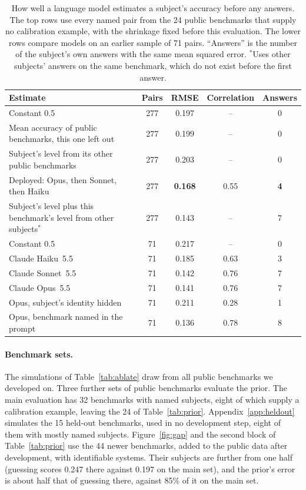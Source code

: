 \documentclass{article}
\begin{document}
\begin{table}[h]
\centering
\caption{How well a language model estimates a subject's accuracy before any answers. The top rows use every named pair from the 24 public benchmarks that supply no calibration example, with the shrinkage fixed before this evaluation. The lower rows compare models on an earlier sample of 71 pairs. ``Answers'' is the number of the subject's own answers with the same mean squared error. $^*$Uses other subjects' answers on the same benchmark, which do not exist before the first answer.}
\label{tab:prior_full}
\small
\begin{tabular}{lcccc}
\toprule
Estimate & Pairs & RMSE & Correlation & Answers \\
\midrule
Constant 0.5 & 277 & 0.197 & -- & 0 \\
Mean accuracy of public benchmarks, this one left out & 277 & 0.199 & -- & 0 \\
Subject's level from its other public benchmarks & 277 & 0.203 & -- & 0 \\
Deployed: Opus, then Sonnet, then Haiku & 277 & \textbf{0.168} & 0.55 & \textbf{4} \\
Subject's level plus this benchmark's level from other subjects$^*$ & 277 & 0.143 & -- & 7 \\
\midrule
Constant 0.5 & 71 & 0.217 & -- & 0 \\
Claude Haiku~5.5 & 71 & 0.185 & 0.63 & 3 \\
Claude Sonnet~5.5 & 71 & 0.142 & 0.76 & 7 \\
Claude Opus~5.5 & 71 & 0.141 & 0.76 & 7 \\
Opus, subject's identity hidden & 71 & 0.211 & 0.28 & 1 \\
Opus, benchmark named in the prompt & 71 & 0.136 & 0.78 & 8 \\
\bottomrule
\end{tabular}
\end{table}


\paragraph{Benchmark sets.} The simulations of Table~\ref{tab:ablate} draw from all public benchmarks we developed on. Three further sets of public benchmarks evaluate the prior. The main evaluation has 32 benchmarks with named subjects, eight of which supply a calibration example, leaving the 24 of Table~\ref{tab:prior}. Appendix~\ref{app:heldout} simulates the 15 held-out benchmarks, used in no development step, eight of them with mostly named subjects. Figure~\ref{fig:gap} and the second block of Table~\ref{tab:prior} use the 44 newer benchmarks, added to the public data after development, with identifiable systems. Their subjects are further from one half (guessing scores 0.247 there against 0.197 on the main set), and the prior's error is about half that of guessing there, against 85\% of it on the main set.
\end{document}

